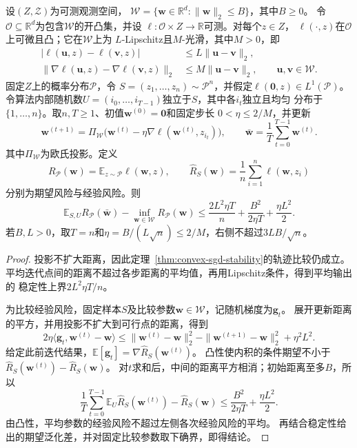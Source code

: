 \begin{theorem}[平均投影SGD的期望风险保证]
\label{thm:averaged-sgd-learning}
设$(Z,\mathcal Z)$为可测观测空间，
$\mathcal W=\{\bm w\in\mathbb R^d:\|\bm w\|_2\leq B\}$，其中$B\geq0$。
令$\mathcal O\subseteq\mathbb R^d$为包含$\mathcal W$的开凸集，并设
$\ell:\mathcal O\times Z\to\mathbb R$可测。对每个$z\in Z$，
$\ell(\cdot,z)$在$\mathcal O$上可微且凸；它在$\mathcal W$上为
$L$-Lipschitz且$M$-光滑，其中$M>0$，即
\[
\begin{aligned}
 |\ell(\bm u,z)-\ell(\bm v,z)|
 &\leq L\|\bm u-\bm v\|_2,\\
 \|\nabla\ell(\bm u,z)-\nabla\ell(\bm v,z)\|_2
 &\leq M\|\bm u-\bm v\|_2,
 \qquad \bm u,\bm v\in\mathcal W.
\end{aligned}
\]
固定$Z$上的概率分布$\mathcal P$，令
$S=(z_1,\ldots,z_n)\sim\mathcal P^n$，并假定$\ell(\bm 0,z)\in L^1(\mathcal P)$。
令算法内部随机数$U=(i_0,\ldots,i_{T-1})$独立于$S$，其中各$i_t$独立且均匀
分布于$\{1,\ldots,n\}$。取$n,T\geq1$、初值$\bm w^{(0)}=\bm 0$和固定步长
$0<\eta\leq2/M$，并更新
\[
 \bm w^{(t+1)}=\Pi_{\mathcal W}
   \bigl(\bm w^{(t)}-\eta\nabla\ell(\bm w^{(t)},z_{i_t})\bigr),
 \qquad
 \bar{\bm w}=\frac1T\sum_{t=0}^{T-1}\bm w^{(t)}.
\]
其中$\Pi_{\mathcal W}$为欧氏投影。定义
\[
 R_{\mathcal P}(\bm w)=\mathbb E_{z\sim\mathcal P}\ell(\bm w,z),
 \qquad
 \hat R_S(\bm w)=\frac1n\sum_{i=1}^n\ell(\bm w,z_i)
\]
分别为期望风险与经验风险。则
\[
 \mathbb E_{S,U}R_{\mathcal P}(\bar{\bm w})-\inf_{\bm w\in\mathcal W}R_{\mathcal P}(\bm w)
 \leq\frac{2L^2\eta T}{n}+\frac{B^2}{2\eta T}+\frac{\eta L^2}{2}.
\]
若$B,L>0$，取$T=n$和$\eta=B/(L\sqrt n)\leq2/M$，右侧不超过$3LB/\sqrt n$。
\end{theorem}
\begin{proof}
投影不扩大距离，因此定理~\ref{thm:convex-sgd-stability}的轨迹比较仍成立。
平均迭代点间的距离不超过各步距离的平均值，再用Lipschitz条件，得到平均输出的
稳定性上界$2L^2\eta T/n$。

为比较经验风险，固定样本$S$及比较参数$\bm w\in\mathcal W$，记随机梯度为$\bm g_t$。
展开更新距离的平方，并用投影不扩大到可行点的距离，得到
\[
 2\eta\langle\bm g_t,\bm w^{(t)}-\bm w\rangle
 \leq\|\bm w^{(t)}-\bm w\|_2^2
 -\|\bm w^{(t+1)}-\bm w\|_2^2+\eta^2L^2.
\]
给定此前迭代结果，$\mathbb E[\bm g_t]=\nabla\hat R_S(\bm w^{(t)})$。
凸性使内积的条件期望不小于
$\hat R_S(\bm w^{(t)})-\hat R_S(\bm w)$。
对$t$求和后，中间的距离平方相消；初始距离至多$B$，所以
\[
 \frac1T\sum_{t=0}^{T-1}\mathbb E_U\hat R_S(\bm w^{(t)})-\hat R_S(\bm w)
 \leq\frac{B^2}{2\eta T}+\frac{\eta L^2}{2}.
\]
由凸性，平均参数的经验风险不超过左侧各次经验风险的平均。
再结合稳定性给出的期望泛化差，并对固定比较参数取下确界，即得结论。
\end{proof}


